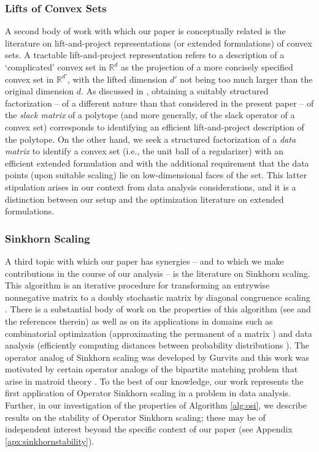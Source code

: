 \documentclass[11pt,letterpaper]{article}
\newcommand{\R}{\mathbb{R}}
\begin{document}
%

\subsubsection{Lifts of Convex Sets}
A second body of work with which our paper is conceptually related is the literature on lift-and-project representations (or extended formulations) of convex sets.  A tractable lift-and-project representation refers to a description of a `complicated' convex set in $\R^d$ as the projection of a more concisely specified convex set in $\R^{d'}$, with the lifted dimension $d'$ not being too much larger than the original dimension $d$.  As discussed in \cite{GPT:13,Yan:91}, obtaining a suitably structured factorization -- of a different nature than that considered in the present paper -- of the \emph{slack matrix} of a polytope (and more generally, of the slack operator of a convex set) corresponds to identifying an efficient lift-and-project description of the polytope.  On the other hand, we seek a structured factorization of a \emph{data matrix} to identify a convex set (i.e., the unit ball of a regularizer) with an efficient extended formulation and with the additional requirement that the data points (upon suitable scaling) lie on low-dimensional faces of the set.  This latter stipulation arises in our context from data analysis considerations, and it is a distinction between our setup and the optimization literature on extended formulations.

\subsubsection{Sinkhorn Scaling}
A third topic with which our paper has synergies -- and to which we make contributions in the course of our analysis -- is the literature on Sinkhorn scaling.  This algorithm is an iterative procedure for transforming an entrywise nonnegative matrix to a doubly stochastic matrix by diagonal congruence scaling \cite{Sin:64}.  There is a substantial body of work on the properties of this algorithm (see \cite{Ide:16} and the references therein) as well as on its applications in domains such as combinatorial optimization (approximating the permanent of a matrix \cite{LSW:00}) and data analysis (efficiently computing distances between probability distributions  \cite{Cut:13}).  The operator analog of Sinkhorn scaling was developed by Gurvits and this work was motivated by certain operator analogs of the bipartite matching problem that arise in matroid theory \cite{Gur:04}.  To the best of our knowledge, our work represents the first application of Operator Sinkhorn scaling in a problem in data analysis.  Further, in our investigation of the properties of Algorithm \ref{alg:osi}, we describe results on the stability of Operator Sinkhorn scaling; these may be of independent interest beyond the specific context of our paper (see Appendix \ref{apx:sinkhornstability}).
\end{document}
